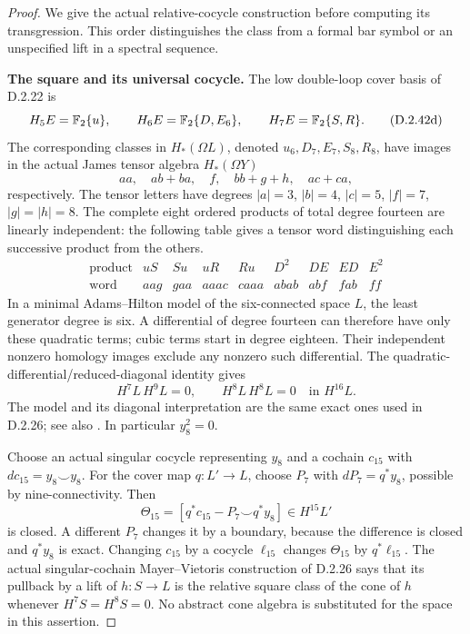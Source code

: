 \begin{proof}
We give the actual relative-cocycle construction before computing
its transgression.  This order distinguishes the class from a
formal bar symbol or an unspecified lift in a spectral sequence.

\medskip\noindent
\textbf{The square and its universal cocycle.}
The low double-loop cover basis of D.2.22 is
\[
 H_5E=\mathbb F_2\{u\},\qquad
 H_6E=\mathbb F_2\{D,E_6\},\qquad
 H_7E=\mathbb F_2\{S,R\}.
 \tag{D.2.42d}
\]
The corresponding classes in $H_*(\Omega L)$, denoted
$u_6,D_7,E_7,S_8,R_8$, have images in the actual James
tensor algebra $H_*(\Omega Y)$
\[
 aa,\quad ab+ba,\quad f,\quad bb+g+h,\quad ac+ca,
 \tag{D.2.42e}
\]
respectively.  The tensor letters have degrees
$|a|=3$, $|b|=4$, $|c|=5$, $|f|=7$, $|g|=|h|=8$.
The complete eight ordered products of total degree fourteen
are linearly independent: the following table gives a tensor
word distinguishing each successive product from the others.
\[
\begin{array}{c|cccccccc}
\text{product}&uS&Su&uR&Ru&D^2&DE&ED&E^2\\ \hline
\text{word}&aag&gaa&aaac&caaa&abab&abf&fab&ff
\end{array}
\tag{D.2.42f}
\]
In a minimal Adams--Hilton model of the six-connected space
$L$, the least generator degree is six.  A differential of
degree fourteen can therefore have only these quadratic
terms; cubic terms start in degree eighteen.  Their independent
nonzero homology images exclude any nonzero such differential.
The quadratic-differential/reduced-diagonal identity gives
\[
 H^7L\,H^9L=0,\qquad H^8L\,H^8L=0
       \quad\text{in }H^{16}L.
 \tag{D.2.42g}
\]
The model and its diagonal interpretation are the same exact
ones used in D.2.26; see also
\cite[\S3.1, p.~300]{FGHHalperinLemaire1995}.
In particular $y_8^2=0$.

Choose an actual singular cocycle representing $y_8$ and a
cochain $c_{15}$ with $dc_{15}=y_8\smile y_8$.
For the cover map $q:L'\to L$, choose $P_7$ with
$dP_7=q^*y_8$, possible by nine-connectivity.  Then
\[
 \Theta_{15}=[q^*c_{15}-P_7\smile q^*y_8]
                     \in H^{15}L'
 \tag{D.2.42h}
\]
is closed.  A different $P_7$ changes it by a boundary, because
the difference is closed and $q^*y_8$ is exact.  Changing
$c_{15}$ by a cocycle $\ell_{15}$ changes $\Theta_{15}$ by
$q^*\ell_{15}$.
The actual singular-cochain Mayer--Vietoris construction of
D.2.26 says that its pullback by a lift of $h:S\to L$ is the
relative square class of the cone of $h$ whenever
$H^7S=H^8S=0$.  No abstract cone algebra is substituted for
the space in this assertion.


\end{proof}
